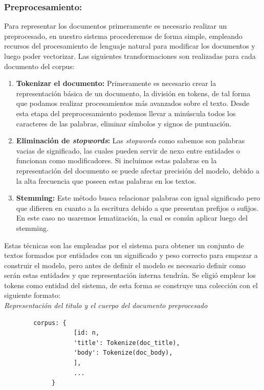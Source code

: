 \documentclass[runningheads,a4paper]{llncs}
\begin{document}
\subsubsection{Preprocesamiento:} 

Para representar los documentos primeramente es necesario realizar un preprocesado, en nuestro sistema procederemos de forma simple, empleando recursos del procesamiento de lenguaje natural para modificar los documentos y luego poder vectorizar. Las siguientes transformaciones son realizadas para cada documento del corpus:

\begin{enumerate}
	\item \textbf{Tokenizar el documento:} Primeramente es necesario crear la representación básica de un documento, la división en tokens, de tal forma que podamos realizar procesamientos más avanzados sobre el texto. Desde esta etapa del preprocesamiento podemos llevar a minúscula todos los caracteres de las palabras, eliminar símbolos y signos de puntuación. \\
	
	\item \textbf{Eliminación de \textit{stopwords}:} Las \textit{stopwords} como sabemos son palabras vacias de significado, las cuales pueden servir de nexo entre entidades o funcionan como modificadores. Si incluimos estas palabras en la representación del documento se puede afectar precisión del modelo, debido a la alta frecuencia que poseen estas palabras en los textos. \\
	
	\item \textbf{Stemming:} Este método busca relacionar palabras con igual significado
	pero que difieren en cuanto a la escritura debido a  que presentan prefijos o
	sufijos. En este caso no usaremos lematización, la cual es común aplicar luego del stemming.
\end{enumerate} 

Estas técnicas son las empleadas por el sistema para obtener un conjunto de textos formados por entidades con un significado y peso correcto para empezar a construir el modelo, pero antes de definir el modelo es necesario definir como serán estas entidades y que representación interna tendrán. Se eligió emplear los tokens como entidad del sistema, de esta forma se construye una colección con el siguiente formato:  \\

\noindent
{\it Representación del titulo y el cuerpo del documento preprocesado}
\begin{verbatim}
	    corpus: {
                   [id: n,
                   'title': Tokenize(doc_title),
                   'body': Tokenize(doc_body),
                   ],
                   ...
             }
\end{verbatim}
%
\noindent
\end{document}
